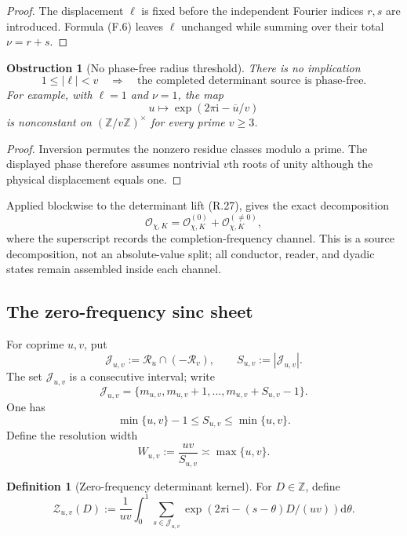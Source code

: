 \documentclass[11pt]{article}
\newtheorem{obstruction}[theorem]{Obstruction}
\theoremstyle{definition}
\newtheorem{definition}[theorem]{Definition}
\theoremstyle{remark}
\newcommand{\Z}{\mathbb Z}
\newcommand{\dd}{\mathrm d}
\newcommand{\ee}[1]{\exp(2\pi\mathrm i #1)}
\begin{document}
\begin{proof}
The displacement $\ell$ is fixed before the independent Fourier indices
$r,s$ are introduced.  Formula \textup{(F.6)} leaves $\ell$ unchanged while
summing over their total $\nu=r+s$.
\end{proof}

\begin{obstruction}[No phase-free radius threshold]
\label{obs:freq-no-radius-threshold}
There is no implication
\[
 1\le |\ell|<v
 \quad\Longrightarrow\quad
 \text{the completed determinant source is phase-free}.
\]
For example, with $\ell=1$ and $\nu=1$, the map
\[
 u\longmapsto\ee{-\overline u/v}
\]
is nonconstant on $(\Z/v\Z)^\times$ for every prime $v\ge3$.
\end{obstruction}

\begin{proof}
Inversion permutes the nonzero residue classes modulo a prime.  The displayed
phase therefore assumes nontrivial $v$th roots of unity although the physical
displacement equals one.
\end{proof}

Applied blockwise to the determinant lift \textup{(R.27)},
 gives the exact decomposition
\[
 \boxed{
 \mathcal O_{\chi,K}
 =\mathcal O_{\chi,K}^{(0)}
  +\mathcal O_{\chi,K}^{(\ne0)},}
 \tag{F.8}
\]
where the superscript records the completion-frequency channel.  This is a
source decomposition, not an absolute-value split; all conductor, reader,
and dyadic states remain assembled inside each channel.

\subsection{The zero-frequency sinc sheet}

For coprime $u,v$, put
\[
 \mathcal J_{u,v}:=\mathcal R_u\cap(-\mathcal R_v),
 \qquad
 S_{u,v}:=|\mathcal J_{u,v}|.
\]
The set $\mathcal J_{u,v}$ is a consecutive interval; write
\[
 \mathcal J_{u,v}
 =\{m_{u,v},m_{u,v}+1,\ldots,m_{u,v}+S_{u,v}-1\}.
\]
One has
\[
 \min\{u,v\}-1\le S_{u,v}\le\min\{u,v\}.
 \tag{F.9}
\]
Define the resolution width
\[
 \boxed{W_{u,v}:=\frac{uv}{S_{u,v}}\asymp\max\{u,v\}.}
 \tag{F.10}
\]

\begin{definition}[Zero-frequency determinant kernel]
\label{def:freq-zero-kernel}
For $D\in\Z$, define
\[
 \boxed{
 \mathscr Z_{u,v}(D)
 :=\frac1{uv}\int_0^1
   \sum_{s\in\mathcal J_{u,v}}
   \ee{-(s-\theta)D/(uv)}\dd\theta.}
 \tag{F.11}
\]
\end{definition}
\end{document}
